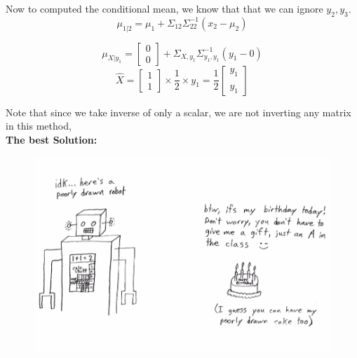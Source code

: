 \documentclass[letterpaper]{article}
\begin{document}
Now to computed the conditional mean, we know that that we can ignore $y_2, y_3$.
$$\mu_{1|2} = \mu_1 + \Sigma_{12}\Sigma^{-1}_{22} (x_2 - \mu_2 ) $$

$$\mu_{X|y_1} = \begin{bmatrix} 0 \\ 0 \end{bmatrix} + \Sigma_{X,y_1}\Sigma^{-1}_{y_1,y_1} (y_1 - 0 ) $$
$$\hat X =  \begin{bmatrix} 1 \\ 1 \end{bmatrix} \times \dfrac{1}{2} \times y_1= \dfrac{1}{2}\begin{bmatrix}
y_1 \\ \\ y_1 \end{bmatrix}$$

 Note that since we take inverse of only a scalar, we are not inverting any matrix in this method,\\
 
 \noindent \textbf{The best Solution:}
\begin{figure}[h]
	\centering \includegraphics[width=0.55\linewidth]{ROB501_Q9.PNG}
\end{figure}
\end{document}
